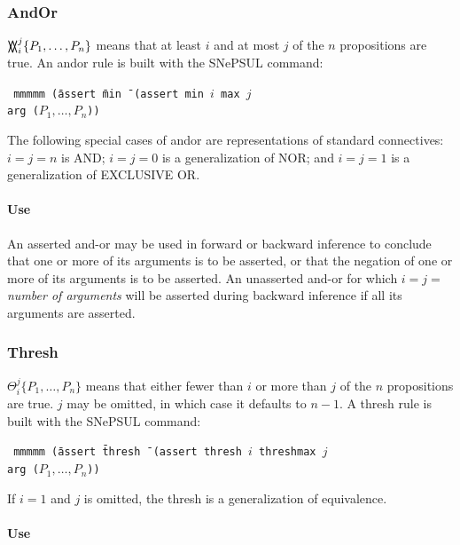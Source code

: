 \documentclass{book}
\begin{document}
\subsubsection{AndOr}

$\bigvee \hspace{-1em} \bigwedge_i^j \{P_1, \ldots, P_n\}$ means that at least $i$ and at most $j$
of the $n$ propositions are true.  An andor rule is built with the SNePSUL command:
\begin{tabbing} \tt
mmmmm \=(assert \=min \= \kill
      \>(assert \>min \>$i$ max $j$ \\
      \>        \>arg \>($P_1, \ldots, P_n$))
\end{tabbing}

The following special cases of andor are representations of standard connectives: $i=j=n$ is AND;
$i=j=0$ is a generalization of NOR; and $i=j=1$ is a generalization of EXCLUSIVE OR.

\paragraph{Use}

An asserted and-or may be used in forward or backward inference to conclude that one or more of its arguments is to be
asserted, or that the negation of one or more of its arguments is to be asserted.  An unasserted and-or for which
$i=j=${\it number of arguments} will be asserted during backward inference if all its arguments are asserted.

\subsubsection{Thresh}

$ \Theta_i^j  \{P_1, \ldots, P_n\}$ means that either fewer than $i$ or more than $j$ of
the $n$ propositions are true.  $j$ may be omitted, in which case it defaults to $n-1$.  A thresh
rule is built with the SNePSUL command:
\begin{tabbing} \tt
mmmmm \=(assert \=thresh \= \kill
      \>(assert \>thresh \>$i$ threshmax $j$ \\
      \>        \>arg \>($P_1, \ldots, P_n$))
\end{tabbing}

If $i=1$ and $j$ is omitted, the thresh is a generalization of equivalence.

\paragraph{Use}
\end{document}
